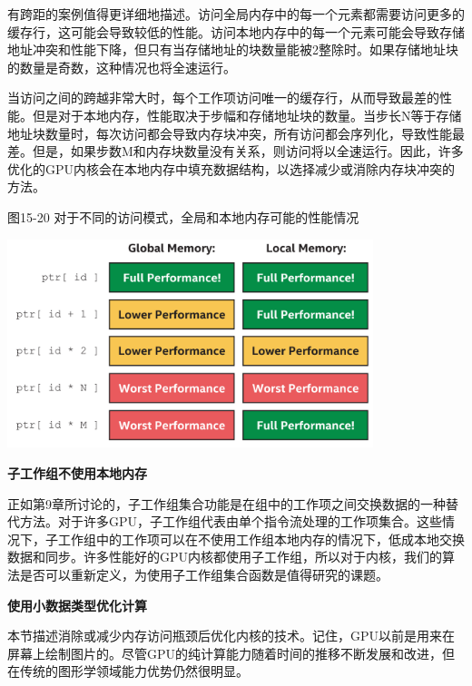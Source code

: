 有跨距的案例值得更详细地描述。访问全局内存中的每一个元素都需要访问更多的缓存行，这可能会导致较低的性能。访问本地内存中的每一个元素可能会导致存储地址冲突和性能下降，但只有当存储地址的块数量能被2整除时。如果存储地址块的数量是奇数，这种情况也将全速运行。\par

当访问之间的跨越非常大时，每个工作项访问唯一的缓存行，从而导致最差的性能。但是对于本地内存，性能取决于步幅和存储地址块的数量。当步长N等于存储地址块数量时，每次访问都会导致内存块冲突，所有访问都会序列化，导致性能最差。但是，如果步数M和内存块数量没有关系，则访问将以全速运行。因此，许多优化的GPU内核会在本地内存中填充数据结构，以选择减少或消除内存块冲突的方法。\par

\hspace*{\fill} \par %
图15-20 对于不同的访问模式，全局和本地内存可能的性能情况
\begin{center}
	\includegraphics[width=0.8\textwidth]{content/chapter-15/images/15}
\end{center}

\hspace*{\fill} \par %
\textbf{子工作组不使用本地内存}

正如第9章所讨论的，子工作组集合功能是在组中的工作项之间交换数据的一种替代方法。对于许多GPU，子工作组代表由单个指令流处理的工作项集合。这些情况下，子工作组中的工作项可以在不使用工作组本地内存的情况下，低成本地交换数据和同步。许多性能好的GPU内核都使用子工作组，所以对于内核，我们的算法是否可以重新定义，为使用子工作组集合函数是值得研究的课题。\par

\hspace*{\fill} \par %
\textbf{使用小数据类型优化计算}

本节描述消除或减少内存访问瓶颈后优化内核的技术。记住，GPU以前是用来在屏幕上绘制图片的。尽管GPU的纯计算能力随着时间的推移不断发展和改进，但在传统的图形学领域能力优势仍然很明显。\par

